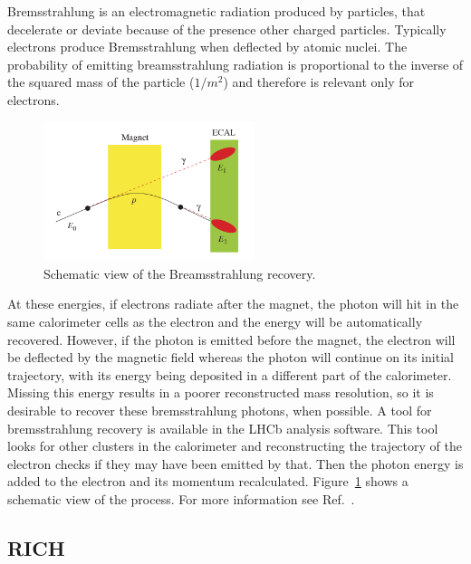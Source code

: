 Bremsstrahlung is an electromagnetic radiation produced by particles, that decelerate or deviate because of
the presence other charged particles. Typically electrons produce Bremsstrahlung when deflected by atomic nuclei.
The probability of emitting breamsstrahlung radiation is proportional to the inverse of the squared mass of the
particle ($1/m^2$) and therefore is relevant only for electrons.
%
\begin{figure}[h!]
\label{bremreco}
\centering
\includegraphics[width=0.55\textwidth]{RKst/figs/brem_recovery.png}
\caption{Schematic view of the Breamsstrahlung recovery. }
\end{figure}
%
At these energies, if electrons radiate after
the magnet, the photon will hit in the same calorimeter cells as the electron and the energy will be automatically
recovered. However, if the photon is emitted before the magnet, the electron will be deflected by the magnetic
field whereas the photon will continue on its initial trajectory, with its energy being deposited in a different
part of the calorimeter. Missing this energy results in a poorer reconstructed \Bz mass resolution, so it is
desirable to recover these bremsstrahlung photons, when possible. A tool for bremsstrahlung recovery is available
in the LHCb analysis software. This tool looks for other clusters in the calorimeter and reconstructing the trajectory
of the electron checks if they may have been emitted by that. Then the photon energy is added to the electron and its
momentum recalculated. Figure~\ref{bremreco} shows a schematic view of the process. For more information see
Ref.~\cite{LHCb:2003ab}.

\subsection{RICH}

